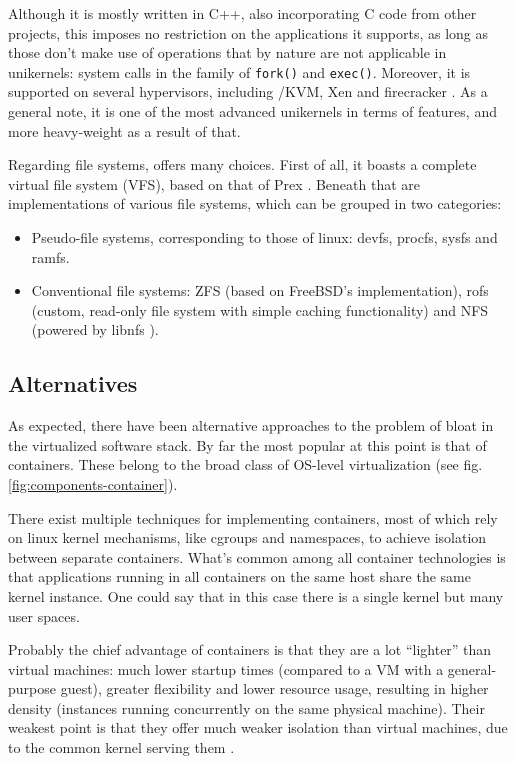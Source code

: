 Although it is mostly written in C++, also incorporating C code from other
projects, this imposes no restriction on the applications it supports, as long
as those don't make use of operations that by nature are not applicable in
unikernels: system calls in the family of \texttt{fork()} and \texttt{exec()}.
Moreover, it is supported on several hypervisors, including \qemu{}/KVM,
Xen and firecracker \cite{firecracker}. As a general note, it is one of the most
advanced unikernels in terms of features, and more heavy-weight as a result of
that.

Regarding file systems, \osv{} offers many choices. First of all, it boasts
a complete virtual file system (VFS), based on that of Prex \cite{prex}. Beneath
that are implementations of various file systems, which can be grouped in
two categories:
\begin{itemize}
    \item Pseudo-file systems, corresponding to those of linux: devfs, procfs,
          sysfs and ramfs.
    \item Conventional file systems: ZFS (based on FreeBSD's implementation),
          rofs (custom, read-only file system with simple caching functionality)
          and NFS (powered by libnfs \cite{libnfs}).
\end{itemize}


\subsection{Alternatives}

As expected, there have been alternative approaches to the problem of bloat in
the virtualized software stack. By far the most popular at this point is that of
containers. These belong to the broad class of OS-level virtualization
\cite{wiki:os-level-virtualization} (see fig. \ref{fig:components-container}).

There exist multiple techniques for implementing containers, most of which rely
on linux kernel mechanisms, like cgroups and namespaces, to achieve isolation
between separate containers. What's common among all container technologies is
that applications running in all containers on the same host share the same
kernel instance. One could say that in this case there is a single kernel but
many user spaces.

Probably the chief advantage of containers is that they are a lot ``lighter''
than virtual machines: much lower startup times (compared to a VM with a
general-purpose guest), greater flexibility and lower resource usage, resulting
in higher density (instances running concurrently on the same physical machine).
Their weakest point is that they offer much weaker isolation than virtual
machines, due to the common kernel serving them \cite{lightvm}.

